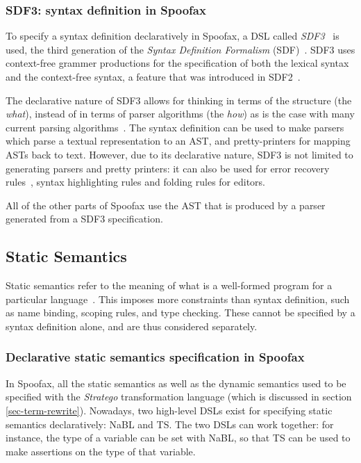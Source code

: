\subsubsection{SDF3: syntax definition in Spoofax}
\label{sec:orgheadline1}
To specify a syntax definition declaratively in Spoofax, a DSL called
\emph{SDF3}~\cite{Vollebregt12} is used, the third generation of the
\emph{Syntax Definition Formalism} (SDF)~\cite{Heering89}. SDF3 uses
context-free grammer productions for the specification of both the
lexical syntax and the context-free syntax, a feature that was
introduced in SDF2~\cite{Visser97}.

The declarative nature of SDF3 allows for thinking in terms of the
structure (the \emph{what}), instead of in terms of parser algorithms (the
\emph{how}) as is the case with many current parsing
algorithms~\cite{Kats10b}. The syntax definition can be used to
make parsers which parse a textual representation to an AST, and
pretty-printers for mapping ASTs back to text. However, due to its
declarative nature, SDF3 is not limited to generating parsers and
pretty printers: it can also be used for error recovery
rules~\cite{deJonge12}, syntax highlighting rules and folding
rules for editors.

All of the other parts of Spoofax use the AST that is produced by a
parser generated from a SDF3 specification.
\subsection{Static Semantics}
\label{sec-static-analysis}
Static semantics refer to the meaning of what is a well-formed program
for a particular language~\cite{Milner97}. This imposes more
constraints than syntax definition, such as name binding, scoping
rules, and type checking. These cannot be specified by a syntax
definition alone, and are thus considered separately.
\subsubsection{Declarative static semantics specification in Spoofax}
\label{sec:orgheadline2}
In Spoofax, all the static semantics as well as the dynamic semantics
used to be specified with the \emph{Stratego} transformation language
(which is discussed in section \ref{sec-term-rewrite}). Nowadays, two
high-level DSLs exist for specifying static semantics declaratively:
NaBL and TS. The two DSLs can work together: for instance, the type of
a variable can be set with NaBL, so that TS can be used to make
assertions on the type of that variable.
